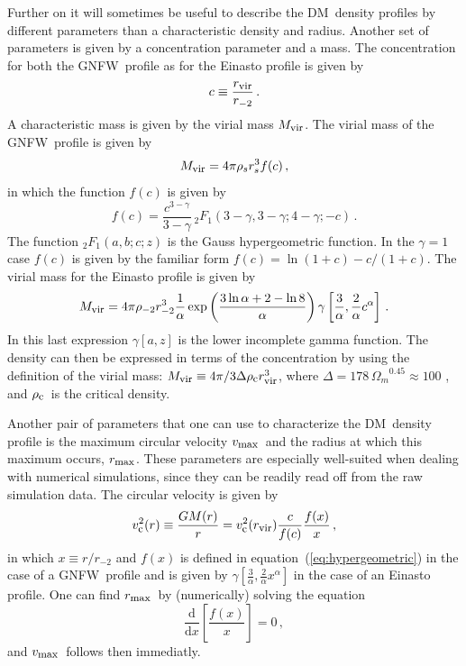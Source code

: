 \documentclass[aps,prd,twocolumn,amsmath,amssymb,floatfix,nofootinbib,10pt]{revtex4}
\newcommand{\NFW}{NFW}
\newcommand{\GNFW}{G\NFW}
\newcommand{\DM}{DM}
\newcommand{\dd}{\mathrm{d}}
\newcommand{\eqnname}{equation}
\newcommand{\rhos}{\ensuremath{\rho_s}}
\newcommand{\rs}{\ensuremath{r_s}}
\newcommand{\rhominustwo}{\ensuremath{\rho_{-2}}}
\newcommand{\rminustwo}{\ensuremath{r_{-2}}}
\newcommand{\alphaEinasto}{\ensuremath{\alpha}}
\newcommand{\Mvir}{\ensuremath{M_{\mbox{{\footnotesize vir}}}}}
\newcommand{\Rvir}{\ensuremath{r_{\mbox{{\footnotesize vir}}}}}
\newcommand{\conc}{\ensuremath{c}}
\newcommand{\rhoc}{\ensuremath{\rho_{\mbox{{\footnotesize c}}}}}
\newcommand{\omegam}{\ensuremath{\Omega_{m}}}
\newcommand{\vcirc}{\ensuremath{v_{\mbox{{\footnotesize c}}}}}
\newcommand{\vmax}{\ensuremath{v_{\mbox{{\footnotesize max}}}}}
\newcommand{\rmax}{\ensuremath{r_{\mbox{{\footnotesize max}}}}}
\begin{document}
Further on it will sometimes be useful to describe the \DM\ density
profiles by different parameters than a characteristic density and
radius. Another set of parameters is given by a concentration
parameter and a mass. The concentration for both the \GNFW\ profile as
for the Einasto profile is given by
\begin{equation}\label{eq:concdef}
\conc \equiv \frac{\Rvir}{\rminustwo}\, .
\end{equation}
A characteristic mass is given by the virial mass \Mvir. The virial
mass of the \GNFW\ profile is given by
\begin{equation}\label{eq:Mvirdef}
\Mvir = 4\pi\rhos\rs^3 f(c)\, ,
\end{equation}
in which the function $f(c)$ is given by
\begin{equation}
f(c) = \frac{c^{3-\gamma}}{3-\gamma} \, {_2F_1}\left(3-\gamma,3-\gamma;4-\gamma;-c\right)\, .
\end{equation}\label{eq:hypergeometric}
The function $_2 F_1\left(a,b;c;z\right)$ is the Gauss hypergeometric
function. In the $\gamma = 1$ case $f(c)$ is given by the familiar
form $f(c) = \ln(1+c)-c/(1+c)$. The virial mass for the Einasto
profile is given by
\begin{equation}
\Mvir = 4\pi\rhominustwo\rminustwo^3 \frac{1}{\alphaEinasto} \exp\left(\frac{3\ln \alphaEinasto + 2 - \ln 8}{\alphaEinasto}\right) \gamma\left[\frac{3}{\alphaEinasto},\frac{2}{\alphaEinasto}\conc^\alphaEinasto\right]\, .
\end{equation}
In this last expression $\gamma\left[a,z\right]$ is the lower
incomplete gamma function. The density can then be expressed in terms
of the concentration by using the definition of the virial mass:
$\Mvir \equiv 4\pi/3 \Delta \rhoc \Rvir^3$, where $\Delta = 178\,
\omegam^{0.45} \approx 100$
\cite{1996MNRAS.282..263E,1998ApJ...495...80B}, and \rhoc\ is the
critical density.

Another pair of parameters that one can use to characterize the \DM\
density profile is the maximum circular velocity \vmax\ and the radius
at which this maximum occurs, \rmax. These parameters are especially
well-suited when dealing with numerical simulations, since they can be
readily read off from the raw simulation data. The circular velocity
is given by
\begin{equation}
\vcirc^2(r) \equiv \frac{G M(r)}{r} = \vcirc^2(\Rvir)\frac{c}{f(c)}\frac{f(x)}{x}\, ,
\end{equation}
in which $x \equiv r/\rminustwo$ and $f(x)$ is defined in \eqnname\
(\ref{eq:hypergeometric}) in the case of a \GNFW\ profile and is given
by
$\gamma\left[\frac{3}{\alphaEinasto},\frac{2}{\alphaEinasto}x^\alphaEinasto\right]$
in the case of an Einasto profile. One can find \rmax\ by
(numerically) solving the equation
\begin{equation}
\frac{\dd}{\dd x}\left[ \frac{f(x)}{x}\right] = 0\, ,
\end{equation}
and \vmax\ follows then immediatly.
\end{document}
